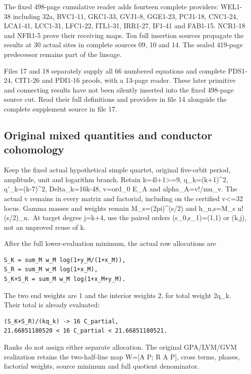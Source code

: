 \documentclass[
]{article}
\begin{document}
The fixed 498-page cumulative reader adds fourteen complete providers:
WEL1-38 including 32a, BVC1-11, GKC1-33, GVJ1-8, GGE1-23, PCJ1-18,
CNC1-24, LCA1-41, LCC1-31, LFC1-22, ITL1-31, IRR1-27, IF1-41 and
FAB1-15. NCR1-18 and NFR1-5 prove their receiving maps. Ten full
insertion sources propagate the results at 30 actual sites in complete
sources 09, 10 and 14. The sealed 419-page predecessor remains part of
the lineage.

Files 17 and 18 separately supply all 66 numbered equations and complete
PDS1-24, CIT1-26 and PDI1-16 proofs, with a 13-page reader. These later
primitive and connecting results have not been silently inserted into
the fixed 498-page source cut. Read their full definitions and providers
in file 14 alongside the complete supplement source in file 17.

\subsection{Original mixed quantities and conductor
cohomology}\label{original-mixed-quantities-and-conductor-cohomology}

Keep the fixed actual hypothetical simple quartet, original five-orbit
period, amplitude, unit and logarithm branch. Retain
k=4l+1\textgreater=9, q\_k=(k+1)\^{}2, q'\_k=(k-7)\^{}2,
Delta\_k=16k-48, v=ord\_0 E\_A and alpha\_A=v!/mu\_v. The actual v
remains in every matrix and factorial, including on the certified
v\textless=32 locus. Gamma masses and weights remain M\_s=(2pi)\^{}(s/2)
and h\_n,s=M\_s n!(s/2)\_n.~At target degree j=k+4, use the paired
orders (s\_0,s\_1)=(1,1) or (k,j), not an unproved reuse of k.

After the full lower-evaluation minimum, the actual row allocations are

\begin{verbatim}
S_K = sum_M w_M log(1+y_M/(1+x_M)),
S_R = sum_M w_M log(1+x_M),
S_K+S_R = sum_M w_M log(1+x_M+y_M).
\end{verbatim}

The two end weights are 1 and the interior weights 2, for total weight
2q\_k. Their total is already evaluated:

\begin{verbatim}
(S_K+S_R)/(kq_k) -> 16 C_partial,
21.66851180520 < 16 C_partial < 21.66851180521.
\end{verbatim}

Ranks do not assign either separate allocation. The original GPA/LVM/GVM
realization retains the two-half-line map W={[}A P; R A P{]}, cross
terms, phases, factorial weights, source minimum and full quotient
denominator.
\end{document}
